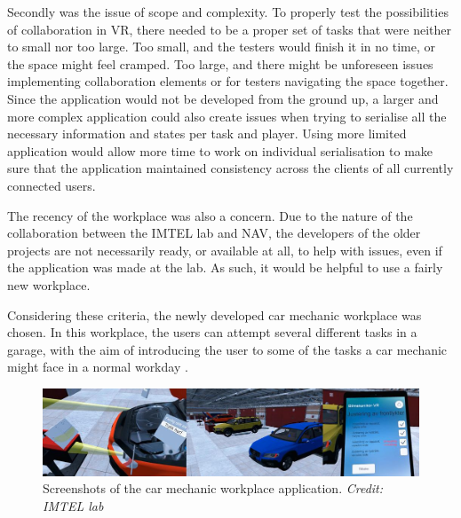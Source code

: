 Secondly was the issue of scope and complexity. To properly test the possibilities of collaboration in VR, there needed to be a proper set of tasks that were neither to small nor too large. Too small, and the testers would finish it in no time, or the space might feel cramped. Too large, and there might be unforeseen issues implementing collaboration elements or for testers navigating the space together. Since the application would not be developed from the ground up, a larger and more complex application could also create issues when trying to serialise all the necessary information and states per task and player. Using more limited application would allow more time to work on individual serialisation to make sure that the application maintained consistency across the clients of all currently connected users. 

The recency of the workplace was also a concern. Due to the nature of the collaboration between the IMTEL lab and NAV, the developers of the older projects are not necessarily ready, or available at all, to help with issues, even if the application was made at the lab. As such, it would be helpful to use a fairly new workplace.

Considering these criteria, the newly developed car mechanic workplace was chosen. In this workplace, the users can attempt several different tasks in a garage, with the aim of introducing the user to some of the tasks a car mechanic might face in a normal workday \cite{IMTELinternships}.


\begin{figure}[H]
  \centering
    \captionsetup{width=1\linewidth}
    \includegraphics[width=1\textwidth]{fig/phase_2/Car-mechanic-app-screen.jpg}
    \caption{Screenshots of the car mechanic workplace application. \textit{Credit: IMTEL lab}}
\label{fig:Car-mechanic-app}
\end{figure}


